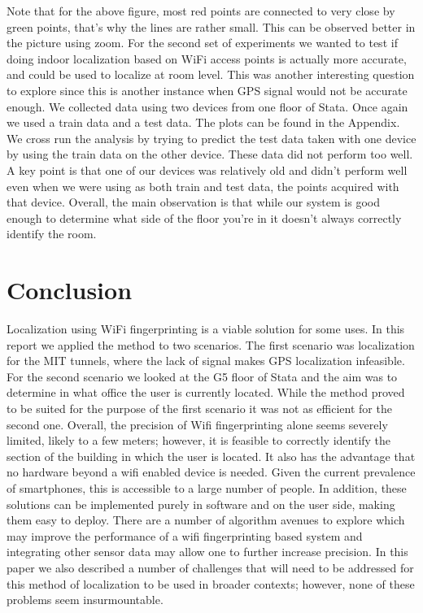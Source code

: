 \documentclass[11pt]{article}
\begin{document}
Note that for the above figure, most red points are connected to very close by green points, that’s why the lines are rather small. This can be observed better in the picture using zoom.
For the second set of experiments we wanted to test if doing indoor localization based on WiFi access points is actually more accurate, and could be used to localize at room level. This was another interesting question to explore since this is another instance when GPS signal would not be accurate enough. We collected data using two devices from one floor of Stata. Once again we used a train data and a test data. The plots can be found in the Appendix. We cross run the analysis by trying to predict the test data taken with one device by using the train data on the other device. These data did not perform too well. A key point is that one of our devices was relatively old and didn’t perform well even when we were using as both train and test data, the points acquired with that device. Overall, the main observation is that while our system is good enough to determine what side of the floor you’re in it doesn’t always correctly identify the room.
\section{Conclusion}
Localization using WiFi fingerprinting is a viable solution for some uses. In this report we applied the method to two scenarios. The first scenario was localization for the MIT tunnels, where the lack of signal makes GPS localization infeasible. For the second scenario we looked at the G5 floor of Stata and the aim was to determine in what office the user is currently located. While the method proved to be suited for the purpose of the first scenario it was not as efficient for the second one. Overall, the precision of Wifi fingerprinting alone seems severely limited, likely to a few meters; however, it is feasible to correctly identify the section of the building in which the user is located. It also has the advantage that no hardware beyond a wifi enabled device is needed. Given the current prevalence of smartphones, this is accessible to a large number of people. In addition, these solutions can be implemented purely in software and on the user side, making them easy to deploy. There are a number of algorithm avenues to explore which may improve the performance of a wifi fingerprinting based system and integrating other sensor data may allow one to further increase precision. In this paper we also described a number of challenges that will need to be addressed for this method of localization to be used in broader contexts; however, none of these problems seem insurmountable.
\end{document}
